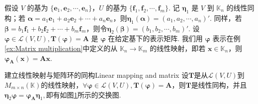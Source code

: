 \documentclass[12pt, a4paper,newtx]{ctexart}
\begin{document}
假设 $V$ 的基为 $\{\bm e_1, \bm e_2, \cdots, \bm e_n\}$，$U$ 的基为 $\{\bm f_1, \bm f_2, \cdots, \bm f_m\}$. 记 $\bm \eta_1$ 是 $V$ 到 $\mathbb{K}_n$ 的线性同构；若 $\bm \alpha = a_1\bm e_1 + a_2\bm e_2 + \cdots + a_n\bm e_n$，则$\bm \eta_1(\bm\alpha) = (a_1, a_2, \cdots, a_n)'.$
同样，若 $\bm\beta = b_1\bm f_1 + b_2\bm f_2 + \cdots + b_m\bm f_m$，则令$\bm\eta_2(\bm \beta) = (b_1, b_2, \cdots, b_m)'.$
设 $\bm\varphi \in \mathcal{L}(V, U),\bm T(\bm\varphi) = \bm A$ 是 $\bm\varphi$ 在给定基下的表示矩阵. 我们用 $\bm\varphi$ 表示在例\ref{ex:Matrix multiplication}中定义的从 $\mathbb{K}_n \rightarrow \mathbb{K}_m$ 的线性映射，即若 $\bm x \in \mathbb{K}_n$，则 $\bm\varphi_{\bm A}(\bm x) = \bm{Ax}$. 
\begin{theorem}{建立线性映射与矩阵环的同构}{Linear mapping and matrix}
	设$\bm T$是从$\mathcal{L}(V, U)$到$M_{m \times n}(\mathbb{K})$的线性映射，$\forall \bm\varphi \in \mathcal{L}(V, U),\bm T(\bm\varphi) = \bm A$，则$\bm T$是线性同构，并且$\bm\eta_2\bm\varphi=\bm\varphi_{\bm A}\bm\eta_1,$即有如图\ref{fig:Interchange graph}所示的交换图. 
\end{theorem}
\begin{figure}[h]
	\centering
	\large
	\caption{}
	\label{fig:Interchange graph}
\end{figure}
\end{document}
